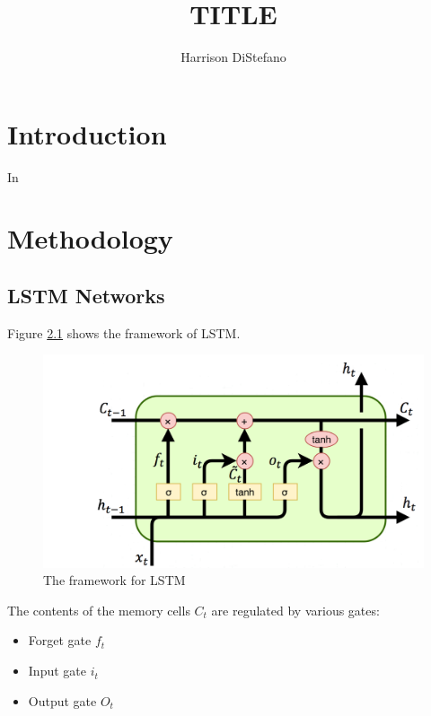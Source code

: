 \documentclass [MS] {uclathes}
\title          {TITLE}
\author         {Harrison DiStefano}
\begin{document}
\makeintropages

%
%

\chapter{Introduction}




In 


\chapter{Methodology}





\section{LSTM Networks}
 Figure \ref{fig:LSTM_architecture} shows the framework of LSTM.

\begin{figure}[h!]
    \centering
    \includegraphics[scale=0.45]{figures/Figure1_frameworkLSTM.png}
    \caption{The framework for LSTM}
    \label{fig:LSTM_architecture}
\end{figure}

The contents of the memory cells $C_t$ are regulated by various gates: 
\begin{itemize}
\item{Forget gate $f_t$}
\item{Input gate $i_t$ }
\item{Output gate $O_t$}
\end{itemize}
\end{document}

